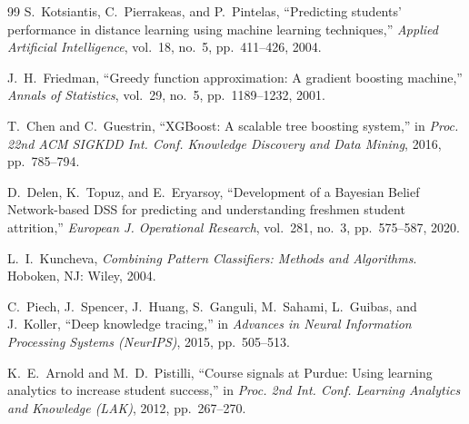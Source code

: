 \documentclass[conference]{IEEEtran}
\begin{document}
\begin{thebibliography}{99}
S.~Kotsiantis, C.~Pierrakeas, and P.~Pintelas, ``Predicting students'
performance in distance learning using machine learning techniques,''
\textit{Applied Artificial Intelligence}, vol.~18, no.~5, pp.~411--426,
2004.

J.~H.~Friedman, ``Greedy function approximation: A gradient boosting machine,''
\textit{Annals of Statistics}, vol.~29, no.~5, pp.~1189--1232, 2001.

T.~Chen and C.~Guestrin, ``XGBoost: A scalable tree boosting system,''
in \textit{Proc. 22nd ACM SIGKDD Int. Conf. Knowledge Discovery and Data
Mining}, 2016, pp.~785--794.

D.~Delen, K.~Topuz, and E.~Eryarsoy, ``Development of a Bayesian Belief
Network-based DSS for predicting and understanding freshmen student attrition,''
\textit{European J. Operational Research}, vol.~281, no.~3, pp.~575--587, 2020.

L.~I.~Kuncheva, \textit{Combining Pattern Classifiers: Methods and Algorithms}.
Hoboken, NJ: Wiley, 2004.

C.~Piech, J.~Spencer, J.~Huang, S.~Ganguli, M.~Sahami, L.~Guibas,
and J.~Koller, ``Deep knowledge tracing,'' in \textit{Advances in Neural
Information Processing Systems (NeurIPS)}, 2015, pp.~505--513.

K.~E.~Arnold and M.~D.~Pistilli, ``Course signals at Purdue: Using learning
analytics to increase student success,'' in \textit{Proc. 2nd Int. Conf.
Learning Analytics and Knowledge (LAK)}, 2012, pp.~267--270.



\end{thebibliography}
\end{document}
